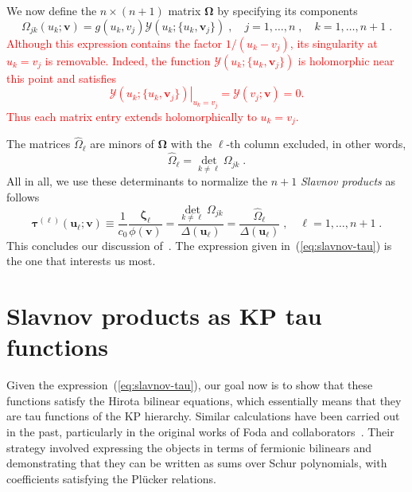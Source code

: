 \documentclass[a4paper,11pt]{amsart}
\begin{document}
We now define the \(n\times (n+1)\) matrix \(\bm{\Omega}\) by specifying its components
\begin{equation}
  \label{eq:omega-matrix-def}
  \Omega_{jk}(u_k; \bm{v}) = g(u_k, v_j) \mathcal{Y}(u_k; \{u_k, \bm{v}_j\})\; ,
  \quad j= 1, \dots, n\; , \quad k =1, \dots, n+1\; .
\end{equation}
\textcolor{red}{Although this expression contains the factor \(1/(u_k-v_j)\), its singularity at
  \(u_k=v_j\) is removable. Indeed, the function \(\mathcal{Y}(u_k;\{u_k,\bm{v}_j\})\) is holomorphic near this point and satisfies
   \begin{equation}
   \left.\mathcal{Y}(u_k;\{u_k,\bm{v}_j\})\right|_{u_k=v_j} =\mathcal{Y}(v_j;\bm{v})=0.
   \end{equation}
Thus each matrix entry extends holomorphically to \(u_k=v_j\).}

The matrices \(\hat{\Omega}_\ell\) are minors of
\(\bm{\Omega}\) with the \(\ell\)-th column excluded, in other words,
\begin{equation}
 \hat{\Omega}_\ell = \det_{k\neq \ell} \Omega_{jk}\; . 
\end{equation}
All in all, we use these determinants to normalize the \(n+1\)
\emph{Slavnov products} as follows
\begin{equation}
  \label{eq:slavnov-tau}
  \bm{\tau}^{(\ell)}(\bm{u}_\ell; \bm{v}) \equiv \frac{1}{c_0}\frac{\bm{\zeta}_\ell}{\phi(\bm{v})}
  = \frac{\det_{k\neq \ell} \Omega_{jk}}{\Delta(\bm{u}_\ell)}
  = \frac{\hat{\Omega}_{\ell}}{\Delta(\bm{u}_\ell)}\; , \quad \ell = 1, \dots, n+1 \; .
\end{equation}
This concludes our discussion of~\cite{Belliard:2019bfz}. The
expression given in~(\ref{eq:slavnov-tau}) is the one that interests
us most.


\section{Slavnov products as KP tau functions}

Given the expression~(\ref{eq:slavnov-tau}), our goal now is to show
that these functions satisfy the Hirota bilinear equations, which
essentially means that they are tau functions of the KP
hierarchy. Similar calculations have been carried out in the past,
particularly in the original works of Foda and
collaborators~\cite{Foda:2009zz, Wheeler:2010vmq, Foda:2010,
  Takasaki:2010qm, Foda:2012wn, Foda:2012wf}.  Their strategy involved
expressing the objects in terms of fermionic bilinears and
demonstrating that they can be written as sums over Schur polynomials,
with coefficients satisfying the Plücker relations.
\end{document}

